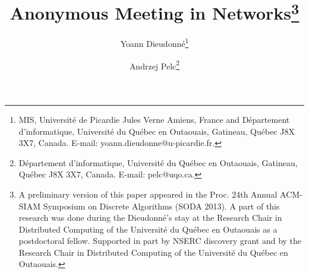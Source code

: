 \documentclass[11pt]{article}
\begin{document}
\baselineskip  0.18in \parskip     0.0in \parindent   0.3in 

\title{{\bf Anonymous Meeting in Networks\thanks{
A preliminary version of this paper appeared in the Proc. 24th Annual ACM-SIAM Symposium on Discrete Algorithms (SODA 2013). 
A part of this research was done during the Dieudonn\'e's stay at the Research Chair in Distributed Computing of
the Universit\'{e} du Qu\'{e}bec en Outaouais as a postdoctoral fellow. Supported in part by NSERC discovery grant 
and by the Research Chair in Distributed Computing of
the Universit\'{e} du Qu\'{e}bec en Outaouais.}}}

\author{
Yoann Dieudonn\'{e}\thanks{MIS, Universit\'{e} de Picardie  Jules  Verne Amiens,  France and D\'{e}partement d'informatique, Universit\'{e} du Qu\'{e}bec en Outaouais,
Gatineau, Qu\'{e}bec J8X 3X7,
Canada. E-mail:  yoann.dieudonne@u-picardie.fr. 
}
\and
Andrzej Pelc\thanks{D\'{e}partement d'informatique, Universit\'{e} du Qu\'{e}bec en Outaouais,
Gatineau, Qu\'{e}bec J8X 3X7,
Canada. E-mail: pelc@uqo.ca.}
}

\date{ }
\maketitle
\end{document}
